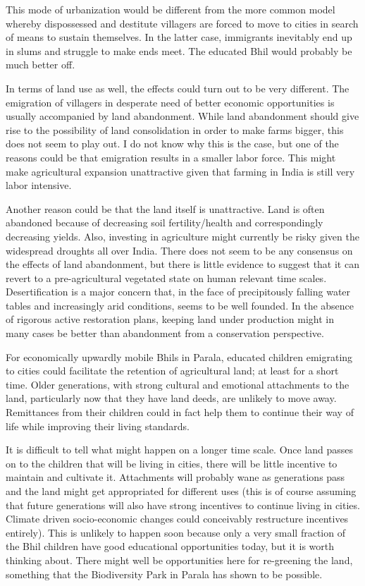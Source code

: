 \documentclass[report.tex]{subfiles}
\begin{document}
This mode of urbanization would be different from the more common model whereby dispossessed and destitute villagers are forced to move to cities in search of means to sustain themselves. In the latter case, immigrants inevitably end up in slums and struggle to make ends meet. The educated Bhil would probably be much better off.

In terms of land use as well, the effects could turn out to be very different. The emigration of villagers in desperate need of better economic opportunities is usually accompanied by land abandonment. While land abandonment should give rise to the possibility of land consolidation in order to make farms bigger, this does not seem to play out. I do not know why this is the case, but one of the reasons could be that emigration results in a smaller labor force. This might make agricultural expansion unattractive given that farming in India is still very labor intensive.

Another reason could be that the land itself is unattractive. Land is often abandoned because of decreasing soil fertility/health and correspondingly decreasing yields. Also, investing in agriculture might currently be risky given the widespread droughts all over India. There does not seem to be any consensus on the effects of land abandonment, but there is little evidence to suggest that it can revert to a pre-agricultural vegetated state on human relevant time scales. Desertification is a major concern that, in the face of precipitously falling water tables and increasingly arid conditions, seems to be well founded. In the absence of rigorous active restoration plans, keeping land under production might in many cases be better than abandonment from a conservation perspective.

For economically upwardly mobile Bhils in Parala, educated children emigrating to cities could facilitate the retention of agricultural land; at least for a short time. Older generations, with strong cultural and emotional attachments to the land, particularly now that they have land deeds, are unlikely to move away. Remittances from their children could in fact help them to continue their way of life while improving their living standards.

It is difficult to tell what might happen on a longer time scale. Once land passes on to the children that will be living in cities, there will be little incentive to maintain and cultivate it. Attachments will probably wane as generations pass and the land might get appropriated for different uses (this is of course assuming that future generations will also have strong incentives to continue living in cities. Climate driven socio-economic changes could conceivably restructure incentives entirely). This is unlikely to happen soon because only a very small fraction of the Bhil children have good educational opportunities today, but it is worth thinking about. There might well be opportunities here for re-greening the land, something that the Biodiversity Park in Parala has shown to be possible.
\end{document}
